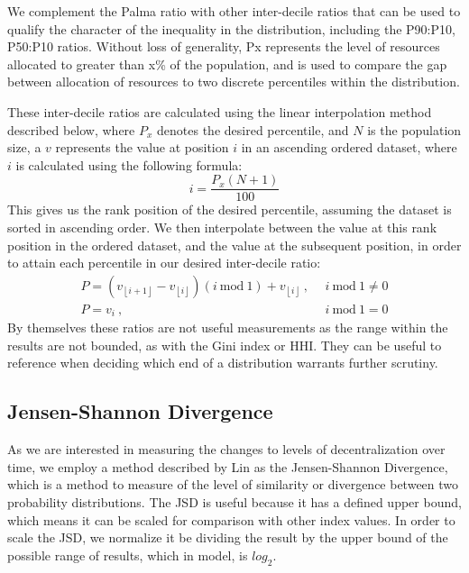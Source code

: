 \documentclass[conference]{IEEEtran}
\begin{document}
We complement the Palma ratio with other inter-decile ratios that can be used to qualify the character of the inequality in the distribution, including the P90:P10, P50:P10 ratios.  Without loss of generality, Px represents the level of resources allocated to greater than x\% of the population, and is used to compare the gap between allocation of resources to two discrete percentiles within the distribution.

These inter-decile ratios are calculated using the linear interpolation method \cite{frost2023B} described below, where $P_x$ denotes the desired percentile, and $N$ is the population size, a $v$ represents the value at position $i$ in an ascending ordered dataset, where $i$ is calculated using the following formula:
\[ i = \frac{P_x\left( N+1 \right)}{100} \]
This gives us the rank position of the desired percentile, assuming the dataset is sorted in ascending order.  We then interpolate between the value at this rank position in the ordered dataset, and the value at the subsequent position, in order to attain each percentile in our desired inter-decile ratio:
\begin{align*}
P = \left( v_{\left\lfloor i+1 \right\rfloor} - v_{\left\lfloor i \right\rfloor}\right)(i \ \text{mod} \ 1) + v_{\left\lfloor i \right\rfloor} \ , & \ \ i \ \text{mod} \ 1 \neq 0 \\
P = v_i \ , & \ \ i \ \text{mod} \ 1 = 0
\end{align*}
By themselves these ratios are not useful measurements as the range within the results are not bounded, as with the Gini index or HHI. They can be useful to reference when deciding which end of a distribution warrants further scrutiny.

\subsection{Jensen-Shannon Divergence}

As we are interested in measuring the changes to levels of decentralization over time,  we employ a method described by Lin \cite{lin1991divergence} as the Jensen-Shannon Divergence, which is a method to measure of the level of similarity or divergence between two probability distributions.  The JSD is useful because it has a defined upper bound, which means it can be scaled for comparison with other index values.  In order to scale the JSD, we normalize it be dividing the result by the upper bound of the possible range of results, which in model, is $log_2$.
\end{document}
